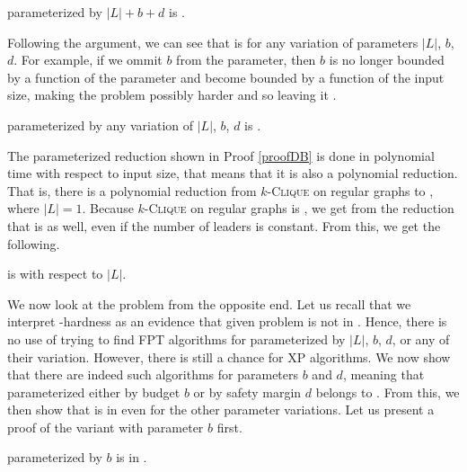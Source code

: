 \begin{remark}\label{cor:LnBD:Wh}
    \HL parameterized by $|L|+b+d$ is \Wh.
\end{remark}

Following the argument, we can see that \HL is \Wh for any variation of parameters $|L|$, $b$, $d$.
For example, if we ommit $b$ from the parameter, then $b$ is no longer bounded by a function of the parameter and
become bounded by a function of the input size, making the problem possibly harder and so leaving it \Wh.

\begin{corollary}\label{cor:LnBD:variation:Wh}
    \HL parameterized by any variation of $|L|$, $b$, $d$ is \Wh.
\end{corollary}

The parameterized reduction shown in Proof \ref{proofDB} is done in polynomial time with respect to input size,
that means that it is also a polynomial reduction.
That is, there is a polynomial reduction from $k$-\textsc{Clique} on regular graphs to \HL, where $|L| = 1$.
Because $k$-\textsc{Clique} on regular graphs is \NPh, we get from the reduction that \HL is \NPh as well,
even if the number of leaders is constant.
From this, we get the following.

\begin{corollary}\label{cor:Ln:pNPh}
    \HL is \pNPh with respect to $|L|$.
\end{corollary}


We now look at the problem from the opposite end.
Let us recall that we interpret \W-hardness as an evidence that given problem is not in \FPT.
Hence, there is no use of trying to find FPT algorithms for \HL parameterized by $|L|$, $b$, $d$, or any of their variation.
However, there is still a chance for XP algorithms.
We now show that there are indeed such algorithms for parameters $b$ and $d$, meaning that
\HL parameterized either by budget $b$ or by safety margin $d$ belongs to \XP.
From this, we then show that \HLshort is in \XP even for the other parameter variations.
Let us present a proof of the variant with parameter $b$ first.

\begin{theorem}\label{theorem:B:XP}
    \HL parameterized by $b$ is in \XP.
\end{theorem}

